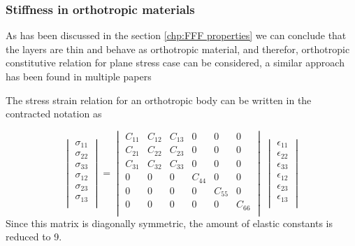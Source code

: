 \subsubsection{Stiffness in orthotropic materials}
As has been discussed in the section \ref{chp:FFF properties} we can conclude that the layers are thin and behave as orthotropic material, and therefor, orthotropic constitutive relation for plane stress case can be considered, a similar approach has been found in multiple papers \cite{Rodriguez2003DesignStrength,Rodriguez2003MechanicalModeling,Somireddy2018DevelopmentFDM} 

The stress strain relation for an orthotropic body can be written in the contracted notation as

\begin{equation}\label{eqn:compliancematrix}
\begin{vmatrix}
\sigma_{11}\\
\sigma_{22}\\
\sigma_{33}\\
\sigma_{12}\\
\sigma_{23}\\
\sigma_{13}\\
\end{vmatrix}
=
\begin{vmatrix}
C_{11}&C_{12}&C_{13}&0&0&0\\
C_{21}&C_{22}&C_{23}&0&0&0\\
C_{31}&C_{32}&C_{33}&0&0&0\\
0&0&0&C_{44}&0&0\\
0&0&0&0&C_{55}&0\\
0&0&0&0&0&C_{66}\\
\end{vmatrix}
\
\begin{vmatrix}
\epsilon_{11}\\
\epsilon_{22}\\
\epsilon_{33}\\
\epsilon_{12}\\
\epsilon_{23}\\
\epsilon_{13}\\
\end{vmatrix}
\end{equation}Since this matrix is diagonally symmetric, the amount of elastic constants is reduced to 9.

